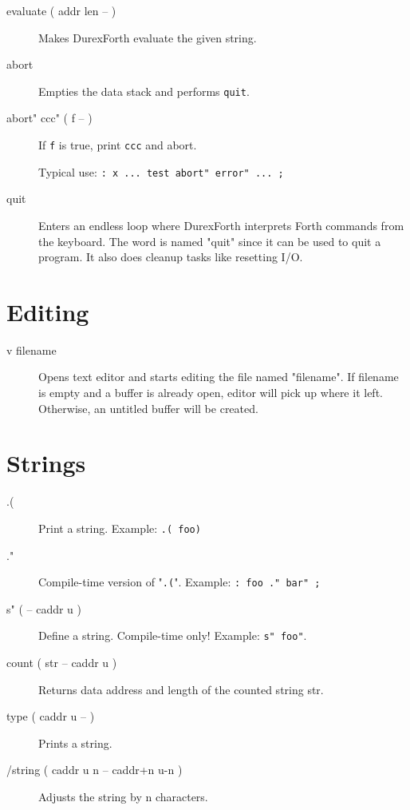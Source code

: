 \begin{description}
\item[evaluate ( addr len -- )] Makes DurexForth evaluate the given string.

\item[abort] Empties the data stack and performs \texttt{quit}.

\item[abort" ccc" ( f -- ) ] If \texttt{f} is true, print \texttt{ccc} and abort.

    Typical use: \texttt{: x ... test abort" error" ... ;}

\item[quit] Enters an endless loop where DurexForth interprets Forth commands from the keyboard. The word is named "quit" since it can be used to quit a program. It also does cleanup tasks like resetting I/O.

\end{description}

\section{Editing}

\begin{description}
\item[v filename]

Opens text editor and starts editing the file named "filename".
If filename is empty and a buffer is already open, editor will pick up where it left.
Otherwise, an untitled buffer will be created.

\end{description}

\section{Strings}

\begin{description}
\item[.(]

Print a string. Example: \texttt{.( foo)}

\item[."]

Compile-time version of "\texttt{.(}". Example: \texttt{: foo ." bar" ;}

\item[s" ( -- caddr u )] Define a string. Compile-time only! Example: \texttt{s" foo"}.

\item[count ( str -- caddr u )] Returns data address and length of the counted string str.

\item[type ( caddr u -- )] Prints a string.

\item[/string ( caddr u n -- caddr+n u-n )] Adjusts the string by n characters.

\end{description}

